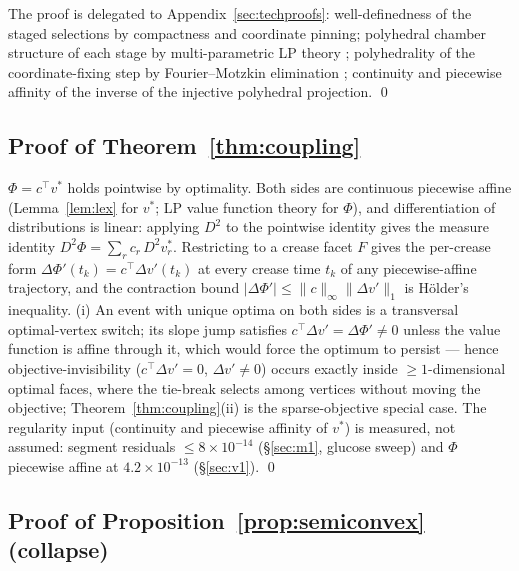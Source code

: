 \documentclass[11pt,a4paper]{article}
\theoremstyle{plain}
\theoremstyle{definition}
\theoremstyle{remark}
\begin{document}
The proof is delegated to Appendix~\ref{sec:techproofs}: well-definedness
of the staged selections by compactness and coordinate pinning;
polyhedral chamber structure of each stage by multi-parametric LP
theory \citep{borrelli2003}; polyhedrality of the
coordinate-fixing step by Fourier--Motzkin elimination
\citep{ziegler1995}; continuity and piecewise affinity of the
inverse of the injective polyhedral projection. \qed

\subsection{Proof of Theorem~\ref{thm:coupling}}

$\Phi = c^\top v^*$ holds pointwise by optimality. Both sides are
continuous piecewise affine (Lemma~\ref{lem:lex} for $v^*$; LP value
function theory for $\Phi$), and differentiation of distributions is
linear: applying $D^2$ to the pointwise identity gives the measure
identity $D^2\Phi = \sum_r c_r\, D^2 v^*_r$. Restricting to a crease
facet $F$ gives the per-crease form $\Delta\Phi'(t_k) = c^\top
\Delta v'(t_k)$ at every crease time $t_k$ of any piecewise-affine
trajectory, and the contraction bound $|\Delta\Phi'| \le
\|c\|_\infty \|\Delta v'\|_1$ is H\"older's inequality. (i) An event
with unique optima on both sides is a transversal optimal-vertex
switch; its slope jump satisfies $c^\top \Delta v' = \Delta\Phi'
\neq 0$ unless the value function is affine through it, which
would force the optimum to persist --- hence
objective-invisibility ($c^\top \Delta v' = 0$, $\Delta v' \ne 0$)
occurs exactly inside $\ge 1$-dimensional optimal faces, where the
tie-break selects among vertices without moving the objective;
Theorem~\ref{thm:coupling}(ii) is the sparse-objective special
case. The regularity input (continuity and piecewise affinity of
$v^*$) is measured, not assumed: segment residuals $\le 8 \times 10^{-14}$ (\S\ref{sec:m1}, glucose sweep) and $\Phi$ piecewise affine at $4.2 \times 10^{-13}$ (\S\ref{sec:v1}). \qed

\subsection{Proof of Proposition~\ref{prop:semiconvex} (collapse)}
\end{document}
